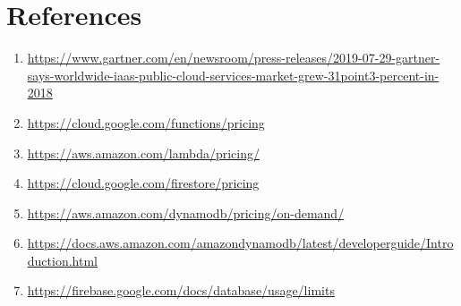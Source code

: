 %
%
\chapter{References}
%
\label{references}

\begin{enumerate}[label=\arabic*.]
  \item \url{https://www.gartner.com/en/newsroom/press-releases/2019-07-29-gartner-says-worldwide-iaas-public-cloud-services-market-grew-31point3-percent-in-2018}
  \item \url{https://cloud.google.com/functions/pricing}
  \item \url{https://aws.amazon.com/lambda/pricing/}
  \item \url{https://cloud.google.com/firestore/pricing}
  \item \url{https://aws.amazon.com/dynamodb/pricing/on-demand/}
  \item \url{https://docs.aws.amazon.com/amazondynamodb/latest/developerguide/Introduction.html}
  \item \url{https://firebase.google.com/docs/database/usage/limits}
\end{enumerate}

